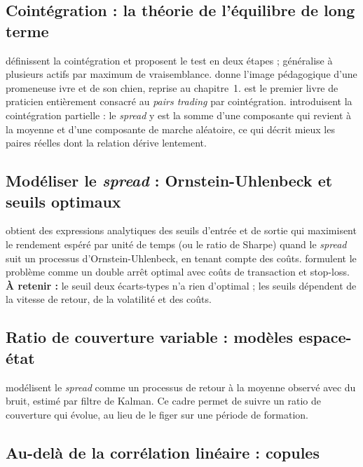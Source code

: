 \subsection{Cointégration : la théorie de l'équilibre de long terme}

\citet{englegranger1987} définissent la cointégration et proposent le test en deux étapes ; \citet{johansen1991} généralise à plusieurs actifs par maximum de vraisemblance. \citet{murray1994} donne l'image pédagogique d'une promeneuse ivre et de son chien, reprise au chapitre~1. \citet{vidyamurthy2004} est le premier livre de praticien entièrement consacré au \emph{pairs trading} par cointégration. \citet{clegg2018} introduisent la cointégration partielle : le \emph{spread} y est la somme d'une composante qui revient à la moyenne et d'une composante de marche aléatoire, ce qui décrit mieux les paires réelles dont la relation dérive lentement.

\subsection{Modéliser le \emph{spread} : Ornstein-Uhlenbeck et seuils optimaux}

\citet{bertram2010} obtient des expressions analytiques des seuils d'entrée et de sortie qui maximisent le rendement espéré par unité de temps (ou le ratio de Sharpe) quand le \emph{spread} suit un processus d'Ornstein-Uhlenbeck, en tenant compte des coûts. \citet{leungli2015} formulent le problème comme un double arrêt optimal avec coûts de transaction et stop-loss. \textbf{À retenir :} le seuil \og deux écarts-types\fg{} n'a rien d'optimal ; les seuils dépendent de la vitesse de retour, de la volatilité et des coûts.

\subsection{Ratio de couverture variable : modèles espace-état}

\citet{elliott2005} modélisent le \emph{spread} comme un processus de retour à la moyenne observé avec du bruit, estimé par filtre de Kalman. Ce cadre permet de suivre un ratio de couverture qui évolue, au lieu de le figer sur une période de formation.

\subsection{Au-delà de la corrélation linéaire : copules}

